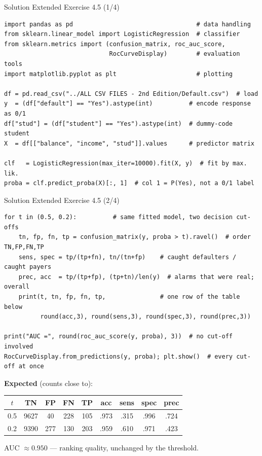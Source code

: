 \documentclass[aspectratio=169,11pt]{beamer}
\begin{document}
\begin{frame}[fragile]{Solution \textemdash{} Extended Exercise 4.5 (1/4)}
\begin{solutionbox}
\begin{lstlisting}
import pandas as pd                                  # data handling
from sklearn.linear_model import LogisticRegression  # classifier
from sklearn.metrics import (confusion_matrix, roc_auc_score,
                             RocCurveDisplay)        # evaluation tools
import matplotlib.pyplot as plt                      # plotting

df = pd.read_csv("../ALL CSV FILES - 2nd Edition/Default.csv")  # load
y  = (df["default"] == "Yes").astype(int)          # encode response as 0/1
df["stud"] = (df["student"] == "Yes").astype(int)  # dummy-code student
X  = df[["balance", "income", "stud"]].values      # predictor matrix

clf   = LogisticRegression(max_iter=10000).fit(X, y)  # fit by max. lik.
proba = clf.predict_proba(X)[:, 1]  # col 1 = P(Yes), not a 0/1 label
\end{lstlisting}
\end{solutionbox}
\end{frame}

\begin{frame}[fragile]{Solution \textemdash{} Extended Exercise 4.5 (2/4)}
\begin{solutionbox}
\begin{lstlisting}[basicstyle=\ttfamily\scriptsize\linespread{0.9}\selectfont]
for t in (0.5, 0.2):          # same fitted model, two decision cut-offs
    tn, fp, fn, tp = confusion_matrix(y, proba > t).ravel()  # order TN,FP,FN,TP
    sens, spec = tp/(tp+fn), tn/(tn+fp)    # caught defaulters / caught payers
    prec, acc  = tp/(tp+fp), (tp+tn)/len(y)  # alarms that were real; overall
    print(t, tn, fp, fn, tp,               # one row of the table below
          round(acc,3), round(sens,3), round(spec,3), round(prec,3))

print("AUC =", round(roc_auc_score(y, proba), 3))  # no cut-off involved
RocCurveDisplay.from_predictions(y, proba); plt.show()  # every cut-off at once
\end{lstlisting}
\textbf{Expected} (counts close to):
\begin{center}\scriptsize
\begin{tabular}{ccccccccc}
\toprule
$t$ & TN & FP & FN & TP & acc & sens & spec & prec\\
\midrule
0.5 & 9627 & 40  & 228 & 105 & .973 & .315 & .996 & .724\\
0.2 & 9390 & 277 & 130 & 203 & .959 & .610 & .971 & .423\\
\bottomrule
\end{tabular}
\end{center}
\vspace{-1mm}
AUC $\approx 0.950$ --- ranking quality, unchanged by the threshold.
\end{solutionbox}
\end{frame}
\end{document}
